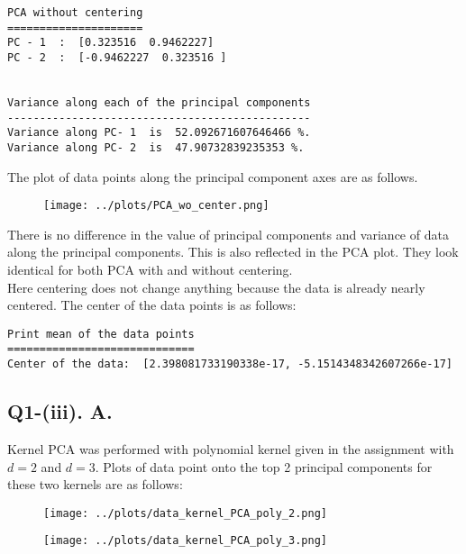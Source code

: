 \begin{verbatim}
PCA without centering
=====================
PC - 1  :  [0.323516  0.9462227]
PC - 2  :  [-0.9462227  0.323516 ]


Variance along each of the principal components
-----------------------------------------------
Variance along PC- 1  is  52.092671607646466 %.
Variance along PC- 2  is  47.90732839235353 %.		
\end{verbatim}

The plot of data points along the principal component axes are as follows.

\begin{figure}[!ht]
	\centering
	\texttt{[image: ../plots/PCA\_wo\_center.png]}
\end{figure}


There is no difference in the value of principal components and variance of data along the principal components. This is also reflected in the PCA plot. They look identical for both PCA with and without centering. \\


Here centering does not change anything because the data is already nearly centered. The center of the data points is as follows:\\

\begin{verbatim}
Print mean of the data points
=============================
Center of the data:  [2.398081733190338e-17, -5.1514348342607266e-17]	
\end{verbatim}

\subsection*{Q1-(iii). A.}

Kernel PCA was performed with polynomial kernel given in the assignment with $d=2$ and $d=3$. Plots of data point onto the top 2 principal components for these two kernels are as follows:\\

\begin{figure}[!ht]
	\centering
	\texttt{[image: ../plots/data\_kernel\_PCA\_poly\_2.png]}
\end{figure}


\begin{figure}[!ht]
	\centering
	\texttt{[image: ../plots/data\_kernel\_PCA\_poly\_3.png]}
\end{figure}


